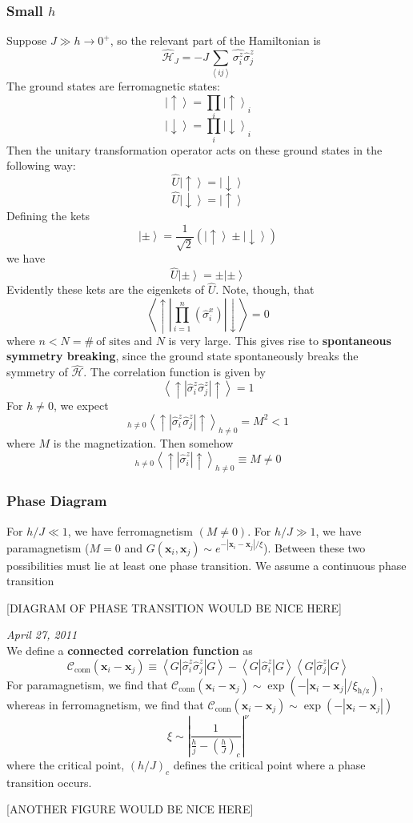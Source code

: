 \documentclass{article}
\begin{document}
	\subsubsection{Small $h$}
	Suppose $J\gg h\to0^+$, so the relevant part of the Hamiltonian is
	$$\hat{\mathcal{H}}_J=-J\sum_{\left<ij\right>}\hat{\sigma_i^z}\hat{\sigma}_j^z$$
	The ground states are ferromagnetic states:
	$$\left|\uparrow\right>=\prod_i\left|\uparrow\right>_i$$
	$$\left|\downarrow\right>=\prod_i\left|\downarrow\right>_i$$
	Then the unitary transformation operator acts on these ground states in the following way:
	$$\hat{U}\left|\uparrow\right>=\left|\downarrow\right>$$
	$$\hat{U}\left|\downarrow\right>=\left|\uparrow\right>$$
	Defining the kets
	$$\left|\pm\right>=\frac{1}{\sqrt{2}}\left(\left|\uparrow\right>\pm\left|\downarrow\right>\right)$$
	we have
	$$\hat{U}\left|\pm\right>=\pm\left|\pm\right>$$
	Evidently these kets are the eigenkets of $\hat{U}$. Note, though, that
	$$\left<\uparrow\left|\prod_{i=1}^n\left(\hat{\sigma}_i^x\right)\right|\downarrow\right>=0$$
	where $n<N=\#\ \textrm{of sites}$ and $N$ is very large. This gives rise to \textbf{spontaneous symmetry breaking}, since the ground state spontaneously breaks the symmetry of $\hat{\mathcal{H}}$. The correlation function is given by
	$$\left<\uparrow\left|\hat{\sigma}_i^z\hat{\sigma}_j^z\right|\uparrow\right>=1$$
	For $h\neq 0$, we expect
	$$_{h\neq 0}\left<\uparrow\left|\hat{\sigma}_i^z\hat{\sigma}_j^z\right|\uparrow\right>_{h\neq 0}=M^2<1$$
	where $M$ is the magnetization. Then somehow
	$$_{h\neq 0}\left<\uparrow\left|\hat{\sigma}_i^z\right|\uparrow\right>_{h\neq 0}\equiv M\neq 0$$
	\subsubsection{Phase Diagram}
	For $h/J\ll 1$, we have ferromagnetism $(M\neq 0)$. For $h/J\gg 1$, we have paramagnetism ($M=0$ and $G(\mathbf{x}_i,\mathbf{x}_j)\sim e^{-\left|\mathbf{x}_i-\mathbf{x}_j\right|/\xi}$). Between these two possibilities must lie at least one phase transition. We assume a continuous phase transition
	
	\begin{center}
	[DIAGRAM OF PHASE TRANSITION WOULD BE NICE HERE]
	\end{center}
	\textit{April 27, 2011}\\
	
	\noindent We define a \textbf{connected correlation function} as
	$$\mathcal{C}_{\mathrm{conn}}(\mathbf{x}_i-\mathbf{x}_j)\equiv \left<G\left|\hat{\sigma}_i^z\hat{\sigma}_j^z\right|G\right>-\left<G\left|\hat{\sigma}_i^z\right|G\right>\left<G\left|\hat{\sigma}_j^z\right|G\right>$$
	For paramagnetism, we find that $\mathcal{C}_{\mathrm{conn}}(\mathbf{x}_i-\mathbf{x}_j)\sim \exp(-\left|\mathbf{x}_i-\mathbf{x}_j\right|/\xi_{\mathrm{h/z}})$, whereas in ferromagnetism, we find that $\mathcal{C}_{\mathrm{conn}}(\mathbf{x}_i-\mathbf{x}_j)\sim\exp(-\left|\mathbf{x}_i-\mathbf{x}_j\right|)$
	$$\xi\sim\left|\frac{1}{\frac{h}{j}-\left(\frac{h}{J}\right)_c}\right|^\nu$$
	where the critical point, $(h/J)_c$ defines the critical point where a phase transition occurs.
	\begin{center}
	[ANOTHER FIGURE WOULD BE NICE HERE]
	\end{center}
\end{document}
